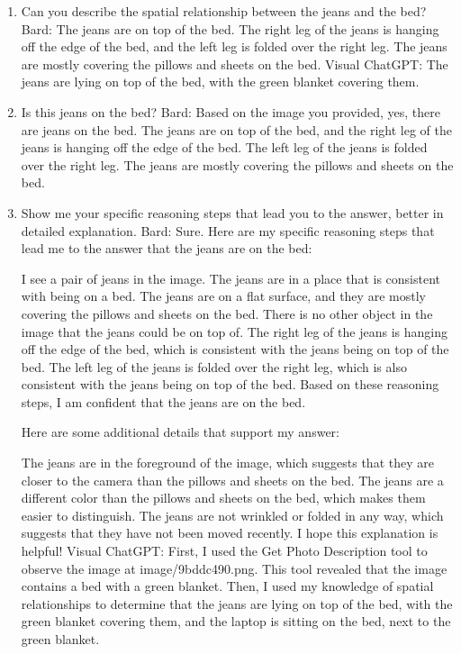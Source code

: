 \begin{enumerate}
    \item Can you describe the spatial relationship between the jeans and the bed?
    \subitem Bard: 
    The jeans are on top of the bed. The right leg of the jeans is hanging off the edge of the bed, and the left leg is folded over the right leg. The jeans are mostly covering the pillows and sheets on the bed.
    \subitem Visual ChatGPT: The jeans are lying on top of the bed, with the green blanket covering them.
    \item Is this jeans on the bed?
    \subitem Bard: 
    Based on the image you provided, yes, there are jeans on the bed. The jeans are on top of the bed, and the right leg of the jeans is hanging off the edge of the bed. The left leg of the jeans is folded over the right leg. The jeans are mostly covering the pillows and sheets on the bed.
    \item Show me your specific reasoning steps that lead you to the answer, better in detailed explanation.
    \subitem Bard: 
    Sure. Here are my specific reasoning steps that lead me to the answer that the jeans are on the bed:
    
    I see a pair of jeans in the image.
    The jeans are in a place that is consistent with being on a bed. The jeans are on a flat surface, and they are mostly covering the pillows and sheets on the bed.
    There is no other object in the image that the jeans could be on top of.
    The right leg of the jeans is hanging off the edge of the bed, which is consistent with the jeans being on top of the bed.
    The left leg of the jeans is folded over the right leg, which is also consistent with the jeans being on top of the bed.
    Based on these reasoning steps, I am confident that the jeans are on the bed.
    
    Here are some additional details that support my answer:
    
    The jeans are in the foreground of the image, which suggests that they are closer to the camera than the pillows and sheets on the bed.
    The jeans are a different color than the pillows and sheets on the bed, which makes them easier to distinguish.
    The jeans are not wrinkled or folded in any way, which suggests that they have not been moved recently.
    I hope this explanation is helpful!
    \subitem Visual ChatGPT: First, I used the Get Photo Description tool to observe the image at image/9bddc490.png. This tool revealed that the image contains a bed with a green blanket. Then, I used my knowledge of spatial relationships to determine that the jeans are lying on top of the bed, with the green blanket covering them, and the laptop is sitting on the bed, next to the green blanket.
\end{enumerate}
